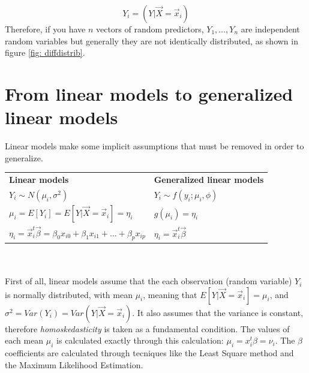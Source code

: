   $$Y_i=(Y|\vec{X}=\vec{x}_i)$$ Therefore, if you have $n$ vectors of random
  predictors, $Y_1, \dots, Y_n$ are independent random variables but generally
  they are not identically distributed, as shown in figure \ref{fig:
  diffdistrib}.

  \section{From linear models to generalized linear models} \label{sect:
  GenLinModels}
  
  Linear models make some implicit assumptions that must be removed in order to
    generalize.
    
    \begin{tabularx}{1\textwidth}{>{\centering\arraybackslash}X
      >{\centering\arraybackslash}X }



    \textbf{Linear models} & \textbf{Generalized linear models} \\

    $Y_i \sim N(\mu_i, \sigma^2)$ & $Y_i \sim f(y_i; \mu_i, \phi)$\\

    $\mu_i = E[Y_i] = E[Y|\vec{X} = \vec{x}_i] = \eta_i$ & $g(\mu_i) = \eta_i$
    \\

    $\eta_i = \vec{x}_i^t\vec{\beta} = \beta_0x_{i0} + \beta_1x_{i1} + \dots +
    \beta_px_{ip}$ & $\eta_i = \vec{x}_i^t\vec{\beta}$\\
    
    \end{tabularx}
\\
\\
    First of all, linear models assume that the each observation (random
    variable) $Y_i$ is normally distributed, with mean $\mu_i$, meaning that
    $E[Y|\vec{X}=\vec{x}_i] = \mu_i$, and $\sigma^2 = Var(Y_i) =
    Var(Y|\vec{X}=\vec{x}_i)$. It also assumes that the variance is constant,
    therefore \emph{homoskedasticity} is taken as a fundamental condition. The
    values of each mean $\mu_i$ is calculated exactly through this calculation:
    $\mu_i = x_i^t \beta = \nu_i$. The $\beta$ coefficients are calculated
    through tecniques like the Least Square method and the Maximum Likelihood
    Estimation.\\
    
